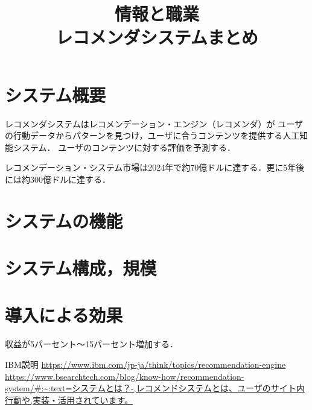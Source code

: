 \documentclass{jlreq}
\title{情報と職業 \\ \vspace{0.5cm} レコメンダシステムまとめ}
\begin{document}
\maketitle

\section{システム概要}
レコメンダシステムはレコメンデーション・エンジン（レコメンダ）が
ユーザの行動データからパターンを見つけ，ユーザに合うコンテンツを提供する人工知能システム．
ユーザのコンテンツに対する評価を予測する．

レコメンデーション・システム市場は2024年で約70億ドルに達する．更に5年後には約300億ドルに達する．


\section{システムの機能}

\section{システム構成，規模}

\section{導入による効果}
収益が5パーセント～15パーセント増加する．

\begin{thebibliography}{99}
     IBM説明 \url{https://www.ibm.com/jp-ja/think/topics/recommendation-engine}
     \url{https://www.bsearchtech.com/blog/know-how/recommendation-system/#:~:text=システムとは？-,レコメンドシステムとは、ユーザのサイト内行動や,実装・活用されています。}
\end{thebibliography}
\end{document}
